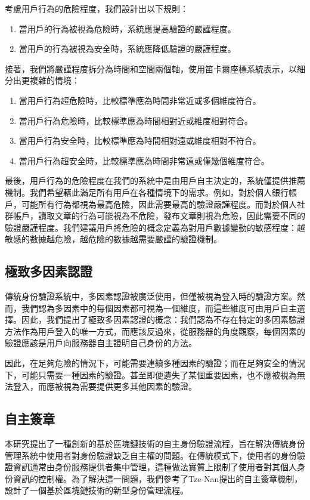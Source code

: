 考慮用戶行為的危險程度，我們設計出以下規則：
\begin{enumerate}
  \item 當用戶的行為被視為危險時，系統應提高驗證的嚴謹程度。
  \item 當用戶的行為被視為安全時，系統應降低驗證的嚴謹程度。
\end{enumerate}

接著，我們將嚴謹程度拆分為時間和空間兩個軸，使用笛卡爾座標系統表示，以細分出更複雜的情境：
\begin{enumerate}
  \item 當用戶行為超危險時，比較標準應為時間非常近或多個維度符合。
  \item 當用戶行為危險時，比較標準應為時間相對近或維度相對符合。
  \item 當用戶行為安全時，比較標準應為時間相對遠或維度相對不符合。
  \item 當用戶行為超安全時，比較標準應為時間非常遠或僅幾個維度符合。
\end{enumerate}

最後，用戶行為的危險程度在我們的系統中是由用戶自主決定的，系統僅提供推薦機制。我們希望藉此滿足所有用戶在各種情境下的需求。例如，對於個人銀行帳戶，可能所有行為都視為最高危險，因此需要最高的驗證嚴謹程度。而對於個人社群帳戶，讀取文章的行為可能視為不危險，發布文章則視為危險，因此需要不同的驗證嚴謹程度。我們建議用戶將危險的概念定義為對用戶數據變動的敏感程度：越敏感的數據越危險，越危險的數據越需要嚴謹的驗證機制。
\subsection{極致多因素認證}
傳統身份驗證系統中，多因素認證被廣泛使用，但僅被視為登入時的驗證方案。然而，我們認為多因素中的每個因素都可視為一個維度，而這些維度可由用戶自主選擇。因此，我們提出了極致多因素認證的概念：我們認為不存在特定的多因素驗證方法作為用戶登入的唯一方式，而應該反過來，從服務器的角度觀察，每個因素的驗證應該是用戶向服務器自主證明自己身份的方法。

因此，在足夠危險的情況下，可能需要連續多種因素的驗證；而在足夠安全的情況下，可能只需要一種因素的驗證。甚至即便遺失了某個重要因素，也不應被視為無法登入，而應被視為需要提供更多其他因素的驗證。
\subsection{自主簽章}
本研究提出了一種創新的基於區塊鏈技術的自主身份驗證流程，旨在解決傳統身份管理系統中使用者對身份驗證缺乏自主權的問題。在傳統模式下，使用者的身份驗證資訊通常由身份服務提供者集中管理，這種做法實質上限制了使用者對其個人身份資訊的控制權。為了解決這一問題，我們參考了Tze-Nan\cite{NTU202102846}提出的自主簽章機制，設計了一個基於區塊鏈技術的新型身份管理流程。

